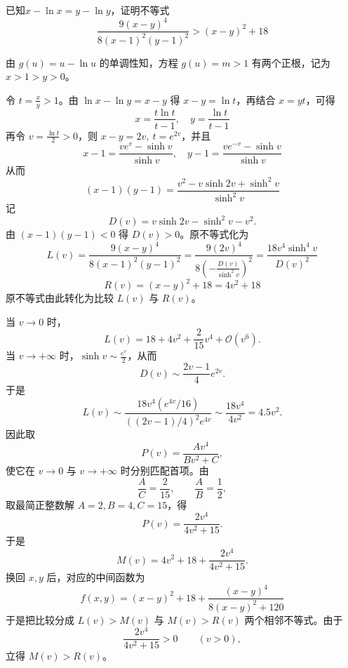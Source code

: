 \begin{example}[证明$\frac{9(x-y)^4}{8(x-1)^2(y-1)^2} > (x-y)^2 + 18$]
已知$x-\ln x=y-\ln y$，证明不等式 \[\frac{9(x-y)^4}{8(x-1)^2(y-1)^2} > (x-y)^2 + 18\]
\end{example}
\begin{solution}
由 $g(u)=u-\ln u$ 的单调性知，方程 $g(u)=m>1$ 有两个正根，记为 $x>1>y>0$。

令 $t = \frac{x}{y}>1$。由 $\ln x - \ln y = x - y$ 得 $x - y = \ln t$，再结合 $x = yt$，可得
$$ x = \frac{t\ln t}{t-1}, \quad y = \frac{\ln t}{t-1} $$
再令 $v = \frac{\ln t}{2}>0$，则 $x - y = 2v,\ t = e^{2v}$，并且
$$ x - 1 = \frac{v e^v - \sinh v}{\sinh v}, \quad y - 1 = \frac{v e^{-v} - \sinh v}{\sinh v} $$
从而
$$ (x-1)(y-1) = \frac{v^2 - v\sinh 2v + \sinh^2 v}{\sinh^2 v} $$
记
\[
D(v) = v\sinh 2v - \sinh^2 v - v^2.
\]
由 $(x-1)(y-1) < 0$ 得 $D(v) > 0$。原不等式化为
$$ L(v) = \frac{9(x-y)^4}{8(x-1)^2(y-1)^2} = \frac{9(2v)^4}{8 \left( -\frac{D(v)}{\sinh^2 v} \right)^2} = \frac{18 v^4 \sinh^4 v}{D(v)^2} $$
$$ R(v) = (x-y)^2 + 18 = 4v^2 + 18 $$
原不等式由此转化为比较 $L(v)$ 与 $R(v)$。

当 $v \to 0$ 时，
\[
L(v) = 18 + 4v^2 + \frac{2}{15}v^4 + \mathcal{O}(v^6).
\]
当 $v \to +\infty$ 时，$\sinh v \sim \frac{e^v}{2}$，从而
\[
D(v) \sim \frac{2v-1}{4}e^{2v}.
\]
于是
\[
L(v) \sim \frac{18v^4(e^{4v}/16)}{((2v-1)/4)^2 e^{4v}} \sim \frac{18v^4}{4v^2} = 4.5v^2.
\]
因此取
\[
P(v) = \frac{A v^4}{B v^2 + C},
\]
使它在 $v \to 0$ 与 $v \to +\infty$ 时分别匹配首项。由
\[
\frac{A}{C} = \frac{2}{15}, \qquad \frac{A}{B} = \frac{1}{2},
\]
取最简正整数解 $A=2, B=4, C=15$，得
\[
P(v) = \frac{2v^4}{4v^2 + 15}.
\]
于是
\[
M(v) = 4v^2 + 18 + \frac{2v^4}{4v^2 + 15}.
\]
换回 $x,y$ 后，对应的中间函数为
$$ f(x,y) = (x-y)^2 + 18 + \frac{(x-y)^4}{8(x-y)^2 + 120} $$
于是把比较分成 $L(v) > M(v)$ 与 $M(v) > R(v)$ 两个相邻不等式。由于
\[
\frac{2v^4}{4v^2 + 15}>0 \qquad (v>0),
\]
立得 $M(v) > R(v)$。


\end{solution}
